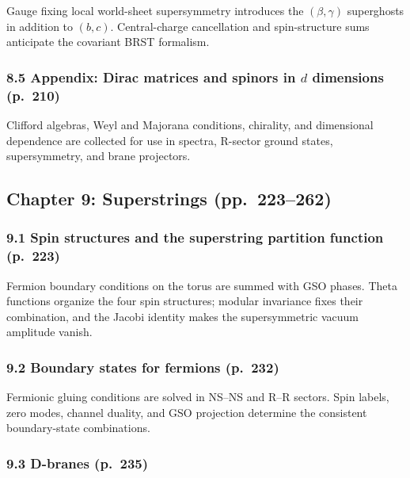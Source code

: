 \documentclass[
  10pt,
  a4paper,
  openany]{book}
\begin{document}
Gauge fixing local world-sheet supersymmetry introduces the
\((\beta,\gamma)\) superghosts in addition to \((b,c)\). Central-charge
cancellation and spin-structure sums anticipate the covariant BRST
formalism.

\subsubsection{\texorpdfstring{8.5 Appendix: Dirac matrices and spinors
in \(d\) dimensions
(p.~210)}{8.5 Appendix: Dirac matrices and spinors in d dimensions (p.~210)}}\label{appendix-dirac-matrices-and-spinors-in-d-dimensions-p.-210}

Clifford algebras, Weyl and Majorana conditions, chirality, and
dimensional dependence are collected for use in spectra, R-sector ground
states, supersymmetry, and brane projectors.

\subsection{Chapter 9: Superstrings
(pp.~223--262)}\label{chapter-9-superstrings-pp.-223262}

\subsubsection{9.1 Spin structures and the superstring partition
function
(p.~223)}\label{spin-structures-and-the-superstring-partition-function-p.-223}

Fermion boundary conditions on the torus are summed with GSO phases.
Theta functions organize the four spin structures; modular invariance
fixes their combination, and the Jacobi identity makes the
supersymmetric vacuum amplitude vanish.

\subsubsection{9.2 Boundary states for fermions
(p.~232)}\label{boundary-states-for-fermions-p.-232}

Fermionic gluing conditions are solved in NS--NS and R--R sectors. Spin
labels, zero modes, channel duality, and GSO projection determine the
consistent boundary-state combinations.

\subsubsection{9.3 D-branes (p.~235)}\label{d-branes-p.-235}
\end{document}
